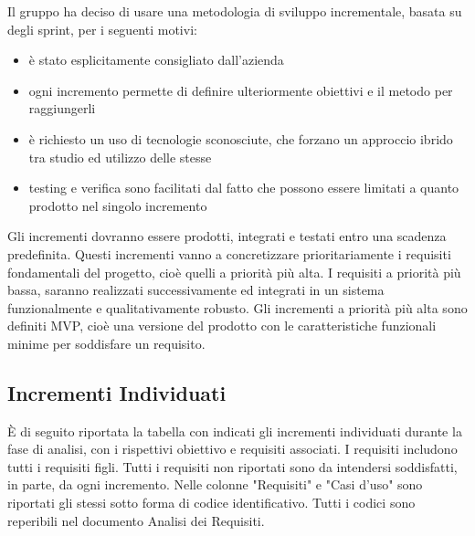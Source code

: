 Il gruppo ha deciso di usare una metodologia di sviluppo incrementale, 
basata su degli sprint, per i seguenti motivi:
\begin{itemize}
    \item 
        è stato esplicitamente consigliato dall'azienda
    \item 
        ogni incremento permette di definire ulteriormente 
        obiettivi e il metodo per raggiungerli
    \item 
        è richiesto un uso di tecnologie sconosciute, che forzano un 
        approccio ibrido tra studio ed utilizzo delle stesse
    \item
        testing e verifica sono facilitati dal fatto che possono essere 
        limitati a quanto prodotto nel singolo incremento
\end{itemize}
Gli incrementi dovranno essere prodotti, integrati e testati entro
una scadenza predefinita. Questi incrementi vanno a concretizzare 
prioritariamente i requisiti fondamentali del progetto, cioè quelli a 
priorità più alta. I requisiti a priorità più bassa, saranno realizzati
successivamente ed integrati in un sistema funzionalmente e qualitativamente robusto.
Gli incrementi a priorità più alta sono definiti MVP, cioè una versione
del prodotto con le caratteristiche funzionali minime per soddisfare un requisito.

\subsection{Incrementi Individuati}
È di seguito riportata la tabella con indicati gli incrementi individuati durante la fase 
di analisi, con i rispettivi obiettivo e requisiti associati. 
I requisiti includono tutti i requisiti figli. Tutti i requisiti non riportati sono da 
intendersi soddisfatti, in parte, da ogni incremento.
Nelle colonne "Requisiti" e "Casi d'uso" sono riportati gli stessi sotto forma di codice 
identificativo. Tutti i codici sono reperibili nel documento Analisi dei Requisiti.

